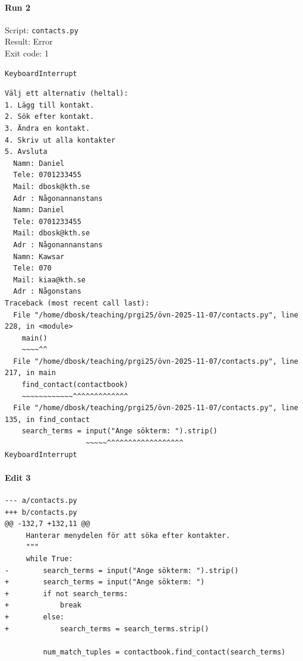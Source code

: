 \documentclass{article}
\begin{document}
\vspace{1em}

\noindent
\begin{minipage}[t]{0.48\linewidth}
\paragraph{Run 2}
Script: \texttt{contacts.py} \\
Result: Error \\
Exit code: 1

\begin{verbatim}
KeyboardInterrupt
\end{verbatim}

\begin{verbatim}
Välj ett alternativ (heltal):
1. Lägg till kontakt.
2. Sök efter kontakt.
3. Ändra en kontakt.
4. Skriv ut alla kontakter
5. Avsluta
  Namn: Daniel
  Tele: 0701233455
  Mail: dbosk@kth.se
  Adr : Någonannanstans
  Namn: Daniel
  Tele: 0701233455
  Mail: dbosk@kth.se
  Adr : Någonannanstans
  Namn: Kawsar
  Tele: 070
  Mail: kiaa@kth.se
  Adr : Någonstans
Traceback (most recent call last):
  File "/home/dbosk/teaching/prgi25/övn-2025-11-07/contacts.py", line 228, in <module>
    main()
    ~~~~^^
  File "/home/dbosk/teaching/prgi25/övn-2025-11-07/contacts.py", line 217, in main
    find_contact(contactbook)
    ~~~~~~~~~~~~^^^^^^^^^^^^^
  File "/home/dbosk/teaching/prgi25/övn-2025-11-07/contacts.py", line 135, in find_contact
    search_terms = input("Ange sökterm: ").strip()
                   ~~~~~^^^^^^^^^^^^^^^^^^
KeyboardInterrupt
\end{verbatim}
\end{minipage}
\hfill
\begin{minipage}[t]{0.48\linewidth}
\paragraph{Edit 3}
\begin{verbatim}
--- a/contacts.py
+++ b/contacts.py
@@ -132,7 +132,11 @@
     Hanterar menydelen för att söka efter kontakter.
     """
     while True:
-        search_terms = input("Ange sökterm: ").strip()
+        search_terms = input("Ange sökterm: ")
+        if not search_terms:
+            break
+        else:
+            search_terms = search_terms.strip()
 
         num_match_tuples = contactbook.find_contact(search_terms)
\end{verbatim}
\end{minipage}
\end{document}
